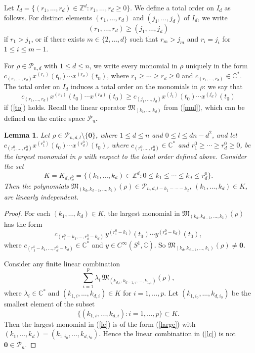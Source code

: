 \documentclass[11pt]{amsart}
\numberwithin{equation}{section}
\newtheorem{lemma}[thm]{Lemma}
\newcommand{\bc}{\mathbb{C}}
\newcommand{\bz}{\mathbb{Z}}
\newcommand{\scp}{\mathscr{P}}
\newcommand{\cisoc}{C^{\infty}\left(S^1, \mathbb{C} \right)}
\newcommand{\pn}{\mathscr{P}_{n}}
\newcommand{\pnd}{\mathscr{P}_{n, d}}
\newcommand{\pndl}{\mathscr{P}_{n, d, l}}
\newcommand{\zero}{\mathbf{0}}
\begin{document}
Let $I_d=\{(r_1,\dots,r_d)\in\bz^d: r_1,\dots,r_d\ge0\}$. We define a total order on $I_d$ as follows. For distinct elements $(r_1,\dots,r_d)$ and $(j_1,\dots,j_d)$ of $I_d$, we write
\begin{equation}\label{to}
    (r_1,\dots,r_d)\ge(j_1,\dots,j_d)
\end{equation}
if $r_1>j_1$, or if there exists $m\in\{2,\dots,d\}$ such that $r_m>j_m$ and $r_i=j_i$ for $1\le i\le m-1$.

For $\rho\in\pnd$ with $1 \le d \le n$,
we write every monomial in $\rho$ uniquely in the form $c_{(r_1,\dots,r_d)}x^{(r_1)}(t_0)\cdots x^{(r_d)}(t_0)$, where $r_1\ge\cdots\ge r_d\ge0$ and $c_{(r_1,\dots,r_d)}\in\bc^{\ast}$. The total order on $I_d$ induces a total order on the monomials in $\rho$: we say that
\[
    c_{(r_1,\dots,r_d)}x^{(r_1)}(t_0)\cdots x^{(r_d)}(t_0)\ge c_{(j_1,\dots,j_d)}x^{(j_1)}(t_0)\cdots x^{(j_d)}(t_0)
\]
if (\ref{to}) holds. Recall the linear operator $\mathfrak{M}_{(k_1,\dots,k_d)}$ from (\ref{mul}),
which can be defined on the entire space $\pn$.

\begin{lemma} \label{construct}
Let $\rho\in\pndl \setminus \{\zero\}$, where $1 \le d \le n$ and $0 \le l \le dn-d^2$, and let $c_{(r_1^0,\dots,r_d^0)}x^{(r_1^0)}(t_0)\cdots x^{(r_d^0)}(t_0)$,
where $c_{(r_1^0,\dots,r_d^0)} \in \bc^{\ast}$ and $r_1^0\ge\cdots\ge r_d^0\ge0$, be the largest monomial in $\rho$ with respect to the total order defined above. Consider the set
\[
    K=K_{d,r_d^0}=\{(k_1,\dots,k_d)\in\bz^d: 0\le k_1\le\cdots\le k_d\le r_d^0\}.
\]
Then the polynomials $\mathfrak{M}_{(k_d,k_{d-1}, \dots,k_1)}(\rho)\in\scp_{n,d,l-k_1-\cdots-k_d}$, $(k_1,\dots,k_d)\in K$, are linearly independent.
\end{lemma}
\begin{proof}
For each $(k_1,\dots,k_d)\in K$, the largest monomial in $\mathfrak{M}_{(k_d,k_{d-1}, \dots,k_1)}(\rho)$ has the form
\begin{equation}\label{large}
    c_{(r_1^0-k_1,\dots,r_d^0-k_d)}\,y^{(r_1^0-k_1)}(t_0)\cdots y^{(r_d^0-k_d)}(t_0),
\end{equation}
where $c_{(r_1^0-k_1,\dots,r_d^0-k_d)}\in\bc^{\ast}$ and $y \in \cisoc$. So $\mathfrak{M}_{(k_d,k_{d-1}, \dots,k_1)}(\rho)\neq\zero$.

Consider any finite linear combination
\begin{equation}\label{lc}
    \sum_{i=1}^{p}\lambda_i\,\mathfrak{M}_{(k_{d,i}, k_{d-1,i}, \dots,k_{1,i})}(\rho),
\end{equation}
where $\lambda_i\in\bc^{\ast}$ and $(k_{1,i},\dots,k_{d,i})\in K$ for $i=1,\dots,p$. Let $(k_{1,i_0},\dots,k_{d,i_0})$ be the smallest element of the subset
\[
    \{(k_{1,i},\dots,k_{d,i}): i=1,\dots,p\}\subset K.
\]
Then the largest monomial in (\ref{lc}) is of the form (\ref{large}) with $(k_1,\dots,k_d)=(k_{1,i_0},\dots,k_{d,i_0})$. Hence the linear combination in (\ref{lc}) is not $\zero \in \pn$.
\end{proof}
\end{document}
